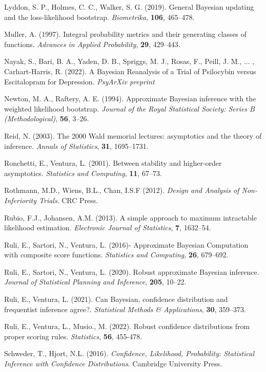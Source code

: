 \documentclass[preprint,12pt,authoryear]{elsarticle}
\begin{document}
\begin{description}
\item
Lyddon, S. P., Holmes, C. C.,  Walker, S. G. (2019). General Bayesian updating and the loss-likelihood bootstrap. {\em Biometrika}, {\bf 106}, 465--478.
\item
Muller, A. (1997). Integral probability metrics and their generating classes of functions. {\em Advances in Applied Probability}, {\bf 29}, 429--443.
\item
Nayak, S., Bari, B. A., Yaden, D. B., Spriggs, M. J., Rosas, F., Peill, J. M., ... , Carhart-Harris, R. (2022). A Bayesian Reanalysis of a Trial of Psilocybin versus Escitalopram for Depression. {\em PsyArXiv preprint}
\item
Newton, M. A.,  Raftery, A. E. (1994). Approximate Bayesian inference with the weighted likelihood bootstrap. {\em Journal of the Royal Statistical Society: Series B (Methodological)}, {\bf 56}, 3--26.
\item
Reid, N. (2003). The 2000 Wald memorial lectures: asymptotics and the theory of inference. {\em Annals of Statistics}, {\bf 31}, 1695--1731.
\item
Ronchetti, E., Ventura, L. (2001). Between stability and higher-order asymptotics. {\em Statistics and Computing}, {\bf 11}, 67--73.
\item
Rothmann, M.D., Wiens, B.L., Chan, I.S.F (2012). {\em Design and Analysis of Non-Inferiority Trials}. CRC Press.
\item
Rubio, F.J., Johansen, A.M. (2013). A simple approach to maximum intractable likelihood
estimation. {\em Electronic Journal of Statistics}, {\bf 7}, 1632--54.
\item
Ruli, E., Sartori, N., Ventura, L. (2016)- Approximate Bayesian Computation with composite score functions. {\em Statistics and Computing}, {\bf 26}, 679--692.
\item
Ruli, E., Sartori, N., Ventura, L. (2020). Robust approximate Bayesian inference. {\em Journal of Statistical Planning and Inference}, {\bf 205}, 10--22.
\item
Ruli, E., Ventura, L. (2021). Can Bayesian, confidence distribution and frequentist inference agree?. {\em Statistical Methods \& Applications}, {\bf 30}, 359--373.
\item
Ruli, E., Ventura, L., Musio., M. (2022). Robust confidence distributions from proper scoring rules. {\em Statistics}, {\bf 56}, 455-478.
\item
Schweder, T., Hjort, N.L. (2016). {\em Confidence, Likelihood, Probability: Statistical Inference with Confidence Distributions}. Cambridge University Press.

\end{description}
\end{document}
